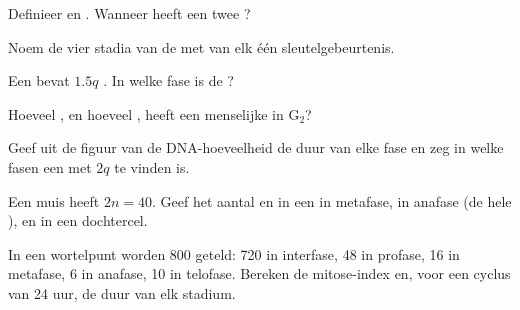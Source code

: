 \begin{exercise}[$\star$]\label{exo:g11:cell-cycle-mitosis:2}
Definieer  en . Wanneer heeft een  twee
?
\end{exercise}

\begin{exercise}[$\star$]\label{exo:g11:cell-cycle-mitosis:3}
Noem de vier stadia van de  met van elk één sleutelgebeurtenis.
\end{exercise}

\begin{exercise}[$\star$]\label{exo:g11:cell-cycle-mitosis:4}
Een  bevat $1.5q$ . In welke fase is de ?
\end{exercise}

\begin{exercise}[$\star$]\label{exo:g11:cell-cycle-mitosis:5}
Hoeveel , en hoeveel , heeft een menselijke  in
$\mathrm{G_2}$?
\end{exercise}

\begin{exercise}[$\star\star$]\label{exo:g11:cell-cycle-mitosis:6}
Geef uit de figuur van de DNA-hoeveelheid de duur van elke fase en zeg in
welke fasen een  met $2q$ te vinden is.
\end{exercise}

\begin{exercise}[$\star\star$]\label{exo:g11:cell-cycle-mitosis:7}
Een muis heeft $2n = 40$. Geef het aantal  en  in
een  in metafase, in anafase (de hele ), en in een dochtercel.
\end{exercise}

\begin{exercise}[$\star\star$]\label{exo:g11:cell-cycle-mitosis:8}
In een wortelpunt worden 800  geteld: 720 in interfase, 48 in
profase, 16 in metafase, 6 in anafase, 10 in telofase. Bereken de
mitose-index en, voor een cyclus van 24 uur, de duur van elk stadium.
\end{exercise}

